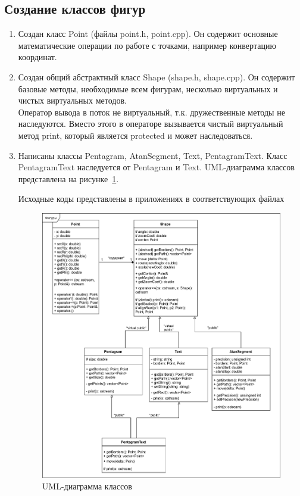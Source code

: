 \documentclass[a4paper, 14pt]{extarticle}
\begin{document}
\subsection{Создание классов фигур}
\begin{enumerate}
    \item Создан класс Point (файлы point.h, point.cpp). Он содержит основные математические операции по работе с точками, например конвертацию координат.
    \item Создан общий абстрактный класс Shape (shape.h, shape.cpp). Он содержит базовые методы, необходимые всем фигурам, несколько виртуальных и чистых виртуальных методов.\\
    Оператор вывода в поток не виртуальный, т.к. дружественные методы не наследуются. Вместо этого в операторе вызывается чистый виртуальный метод print, который является protected и может наследоваться.
    \item Написаны классы Pentagram, AtanSegment, Text, PentagramText. Класс PentagramText наследуется от Pentagram и Text. UML-диаграмма классов представлена на рисунке~\ref{img:uml:shapes}.

    Исходные коды представлены в приложениях в соответствующих файлах
    \begin{figure}[h]
        \centering
        \includegraphics[width=\textwidth]{./img/classes_uml.png}
        \caption{UML-диаграмма классов}%
        \label{img:uml:shapes}
    \end{figure}
\end{enumerate}
\end{document}
